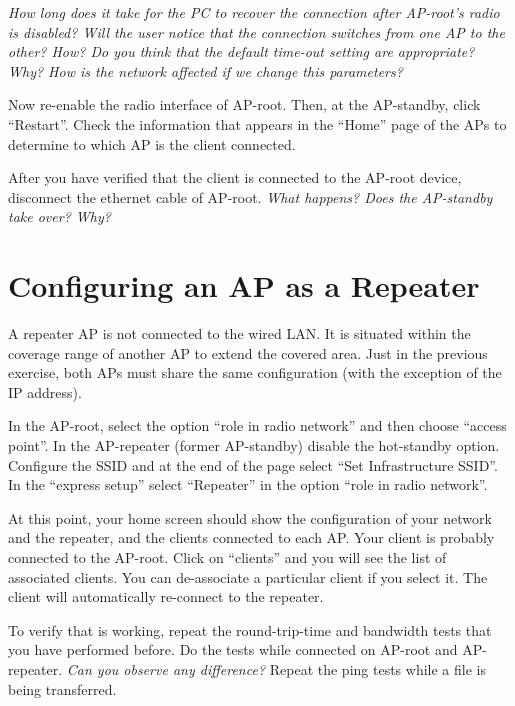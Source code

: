 \emph{How long does it take for the PC to recover the connection after AP-root's radio is disabled?
Will the user notice that the connection switches from one AP to the other? How?
Do you think that the default time-out setting are appropriate? Why?
How is the network affected if we change this parameters?
}

Now re-enable the radio interface of AP-root.
Then, at the AP-standby, click ``Restart''.
Check the information that appears in the ``Home'' page of the APs to determine to which AP is the client connected.

After you have verified that the client is connected to the AP-root device, disconnect the ethernet cable of AP-root.
\emph{What happens? Does the AP-standby take over? Why?}

\section{Configuring an AP as a Repeater}

A repeater AP is not connected to the wired LAN.
It is situated within the coverage range of another AP to extend the covered area.
Just in the previous exercise, both APs must share the same configuration (with the exception of the IP address).

In the AP-root, select the option ``role in radio network'' and then choose ``access point''.
In the AP-repeater (former AP-standby) disable the hot-standby option.
Configure the SSID and at the end of the page select ``Set Infrastructure SSID''.
In the ``express setup'' select ``Repeater'' in the option ``role in radio network''.

At this point, your home screen should show the configuration of your network and the repeater, and the clients connected to each AP.
Your client is probably connected to the AP-root.
Click on ``clients'' and you will see the list of associated clients.
You can de-associate a particular client if you select it.
The client will automatically re-connect to the repeater.

To verify that is working, repeat the round-trip-time and bandwidth tests that you have performed before.
Do the tests while connected on AP-root and AP-repeater.
\emph{Can you observe any difference?}
Repeat the ping tests while a file is being transferred.





